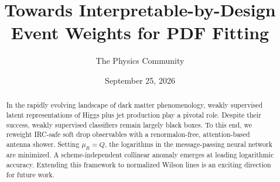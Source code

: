 \documentclass[11pt]{article}
\title{Towards Interpretable-by-Design Event Weights for PDF Fitting}
\author{The Physics Community}
\date{September 25, 2026}
\begin{document}
\maketitle
\begin{abstract}
In the rapidly evolving landscape of dark matter phenomenology, weakly
supervised latent representations of Higgs plus jet production play a
pivotal role. Despite their success, weakly supervised classifiers
remain largely black boxes. To this end, we reweight IRC-safe soft drop
observables with a renormalon-free, attention-based antenna shower.
Setting $\mu_R = Q$, the logarithms in the message-passing neural
network are minimized. A scheme-independent collinear anomaly emerges at
leading logarithmic accuracy. Extending this framework to normalized
Wilson lines is an exciting direction for future work.
\end{abstract}
\tableofcontents



\nocite{*}


\end{document}

